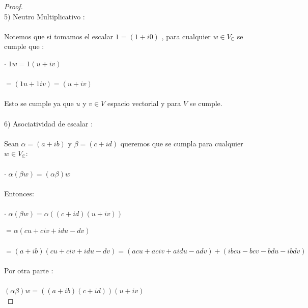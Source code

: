\documentclass[11pt]{article}
\theoremstyle{definition} %
\begin{document}
\begin{proof}
\\

5) Neutro Multiplicativo :\\

\\

Notemos que si tomamos el escalar $1 = (1 + i0)$ , para cualquier $w \in V_\mathbb{C}$ se cumple que : 

$\cdot$ $1w = 1(u + iv)$\\

\\

$= (1u + 1iv) = (u + iv)$\\

\\

Esto se cumple ya que $u$ y $v \in V$ espacio vectorial y para $V$ se cumple.\\

\\

6) Asociatividad de escalar : \\

\\

Sean $\alpha = (a + ib)$ y $\beta = (c + id)$ queremos que se cumpla para cualquier $w \in V_\mathbb{C}$:\\

\\

$\cdot$ $\alpha(\beta w) = (\alpha\beta)w$\\

\\Entonces:\\

\\

$\cdot$ $\alpha(\beta w) = \alpha((c + id)(u + iv))$

$= \alpha(cu + civ + idu - dv)$ \\

\\

$=(a + ib)(cu + civ + idu - dv) = (acu +aciv + aidu -adv) + (ibcu - bcv - bdu - ibdv)$\\

\\Por otra parte :\\

\\

$(\alpha\beta)w = ((a + ib)(c + id))(u +iv)$\\


\end{proof}
\end{document}

